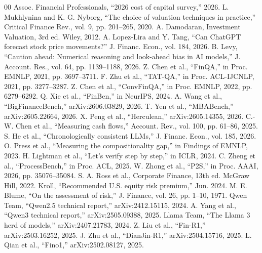 \documentclass[conference]{IEEEtran}
\begin{document}
\begin{thebibliography}{00}
 Assoc. Financial Professionals, ``2026 cost of capital survey,'' 2026.
 L. Mukhlynina and K. G. Nyborg, ``The choice of valuation techniques in practice,'' Critical Finance Rev., vol. 9, pp. 201--265, 2020.
 A. Damodaran, Investment Valuation, 3rd ed. Wiley, 2012.
 A. Lopez-Lira and Y. Tang, ``Can ChatGPT forecast stock price movements?'' J. Financ. Econ., vol. 184, 2026.
 B. Levy, ``Caution ahead: Numerical reasoning and look-ahead bias in AI models,'' J. Account. Res., vol. 64, pp. 1139--1188, 2026.
 Z. Chen et al., ``FinQA,'' in Proc. EMNLP, 2021, pp. 3697--3711.
 F. Zhu et al., ``TAT-QA,'' in Proc. ACL-IJCNLP, 2021, pp. 3277--3287.
 Z. Chen et al., ``ConvFinQA,'' in Proc. EMNLP, 2022, pp. 6279--6292.
 Q. Xie et al., ``FinBen,'' in NeurIPS, 2024.
 A. Wang et al., ``BigFinanceBench,'' arXiv:2606.03829, 2026.
 T. Yen et al., ``MBABench,'' arXiv:2605.22664, 2026.
 X. Peng et al., ``Herculean,'' arXiv:2605.14355, 2026.
 C.-W. Chen et al., ``Measuring cash flows,'' Account. Rev., vol. 100, pp. 61--86, 2025.
 S. He et al., ``Chronologically consistent LLMs,'' J. Financ. Econ., vol. 185, 2026.
 O. Press et al., ``Measuring the compositionality gap,'' in Findings of EMNLP, 2023.
 H. Lightman et al., ``Let's verify step by step,'' in ICLR, 2024.
 C. Zheng et al., ``ProcessBench,'' in Proc. ACL, 2025.
 W. Zhong et al., ``P2S,'' in Proc. AAAI, 2026, pp. 35076--35084.
 S. A. Ross et al., Corporate Finance, 13th ed. McGraw Hill, 2022.
 Kroll, ``Recommended U.S. equity risk premium,'' Jun. 2024.
 M. E. Blume, ``On the assessment of risk,'' J. Finance, vol. 26, pp. 1--10, 1971.
 Qwen Team, ``Qwen2.5 technical report,'' arXiv:2412.15115, 2024.
 A. Yang et al., ``Qwen3 technical report,'' arXiv:2505.09388, 2025.
 Llama Team, ``The Llama 3 herd of models,'' arXiv:2407.21783, 2024.
 Z. Liu et al., ``Fin-R1,'' arXiv:2503.16252, 2025.
 J. Zhu et al., ``DianJin-R1,'' arXiv:2504.15716, 2025.
 L. Qian et al., ``Fino1,'' arXiv:2502.08127, 2025.
\end{thebibliography}
\end{document}

